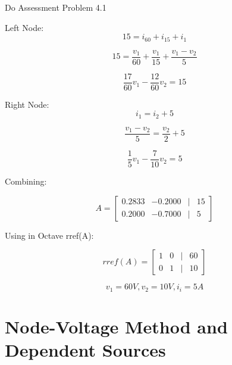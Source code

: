 \documentclass[14pt]{memoir}
\begin{document}
\begin{tcolorbox}
Do Assessment Problem 4.1


Left Node:
\begin{equation}
15 = i_{60} + i_{15} + i_1
\end{equation}

\begin{equation}
15 = \frac{v_1}{60} + \frac{v_1}{15} + \frac{v_1 - v_2}{5}
\end{equation}

\begin{equation}
\frac{17}{60} v_1 - \frac{12}{60} v_2 = 15
\end{equation}

Right Node:
\begin{equation}
i_1 = i_2 + 5
\end{equation}

\begin{equation}
 \frac{v_1 - v_2}{5} = \frac{v_2}{2} + 5
\end{equation}

\begin{equation}
\frac{1}{5} v_1 - \frac{7}{10} v_2 = 5
\end{equation}

Combining:

\begin{equation}
A = 
\begin{bmatrix}
0.2833 & -0.2000 & | & 15 \\
0.2000 & -0.7000 & | &  5 
\end{bmatrix}
\end{equation}

Using in Octave rref(A):

\begin{equation}
rref(A) = 
\begin{bmatrix}
1 & 0 & | & 60 \\
0 & 1 & | & 10 
\end{bmatrix}
\end{equation}

\begin{equation}
v_1 = 60 V, 
v_2 = 10 V, 
i_i = 5 A
\end{equation}



\end{tcolorbox}

\section{Node-Voltage Method and Dependent Sources}
\end{document}
